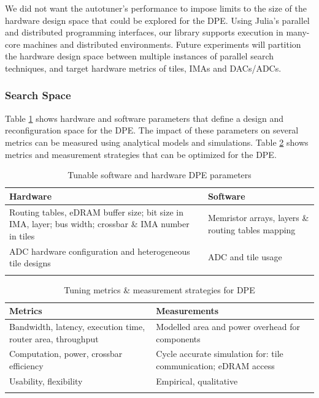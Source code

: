 We did not want the autotuner's performance to impose limits to the size of the
hardware design space that could be explored for the DPE. Using Julia's
parallel and distributed programming interfaces, our library supports execution
in many-core machines and distributed environments. Future experiments will
partition the hardware design space between multiple instances of parallel
search techniques, and target hardware metrics of tiles, IMAs and DACs/ADCs.

\subsubsection{Search Space}

Table \ref{tab:hard-soft-params} shows hardware and software parameters that
define a design and reconfiguration space for the DPE. The impact of these
parameters on several metrics can be measured using analytical models and
simulations.  Table \ref{tab:metrics-measurements} shows metrics and
measurement strategies that can be optimized for the DPE.

\begin{table}[htpb]
\centering
\begin{tabular}{@{}p{}p{}@{}}
\toprule
\textbf{Hardware} & \textbf{Software} \\ \midrule
Routing tables, eDRAM buffer size; bit size in IMA, layer; bus width; crossbar \& IMA number in tiles & Memristor arrays, layers \& routing tables mapping  \\
\addlinespace
ADC hardware configuration and heterogeneous tile designs & ADC and tile usage \\ \bottomrule
\addlinespace
\end{tabular}
\caption{Tunable software and hardware DPE parameters
}
\label{tab:hard-soft-params}
\end{table}

\begin{table}[htpb]
\centering
\begin{tabular}{@{}p{}p{}@{}}
\toprule
\textbf{Metrics} & \textbf{Measurements} \\ \midrule
Bandwidth, latency, execution time, router area, throughput & Modelled area and power overhead for components \\
\addlinespace
Computation, power, crossbar efficiency & Cycle accurate simulation for: tile communication; eDRAM access \\
\addlinespace
Usability, flexibility & Empirical, qualitative \\ \bottomrule
\addlinespace
\end{tabular}
\caption{Tuning metrics \& measurement strategies for DPE}
\label{tab:metrics-measurements}
\end{table}

